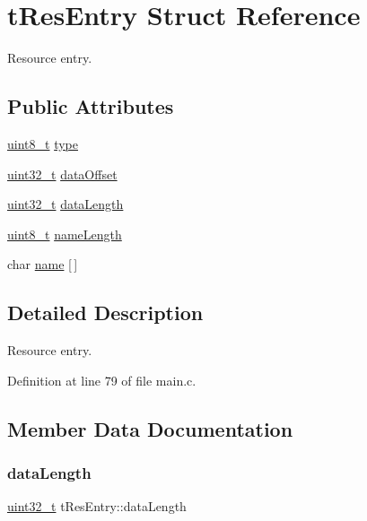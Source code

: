 \hypertarget{structtResEntry}{}\section{t\+Res\+Entry Struct Reference}
\label{structtResEntry}


Resource entry.  


\subsection*{Public Attributes}
\begin{DoxyCompactItemize}
\item 
\hyperlink{stdint_8h_aba7bc1797add20fe3efdf37ced1182c5}{uint8\+\_\+t} \hyperlink{structtResEntry_a47648b5006a5bb90c673c1589b95673c}{type}
\item 
\hyperlink{stdint_8h_a435d1572bf3f880d55459d9805097f62}{uint32\+\_\+t} \hyperlink{structtResEntry_a88513f415b06add371a6b323fecf07ab}{data\+Offset}
\item 
\hyperlink{stdint_8h_a435d1572bf3f880d55459d9805097f62}{uint32\+\_\+t} \hyperlink{structtResEntry_ab6c46c2d54823acfa660e98e8428ba1e}{data\+Length}
\item 
\hyperlink{stdint_8h_aba7bc1797add20fe3efdf37ced1182c5}{uint8\+\_\+t} \hyperlink{structtResEntry_ac0518953ee4a06845374e9a505695434}{name\+Length}
\item 
char \hyperlink{structtResEntry_af8a44a299155173ce72de5b75683e9fb}{name} \mbox{[}$\,$\mbox{]}
\end{DoxyCompactItemize}


\subsection{Detailed Description}
Resource entry. 

Definition at line 79 of file main.\+c.



\subsection{Member Data Documentation}
\mbox{\label{structtResEntry_ab6c46c2d54823acfa660e98e8428ba1e}} 
\subsubsection{\texorpdfstring{data\+Length}{dataLength}}
{\footnotesize\ttfamily \hyperlink{stdint_8h_a435d1572bf3f880d55459d9805097f62}{uint32\+\_\+t} t\+Res\+Entry\+::data\+Length}



